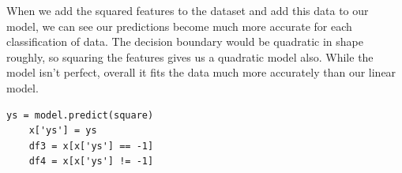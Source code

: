 \documentclass[10pt,a4paper]{article}
\begin{document}
\begin{figure}[h]
\centering
{}
\qquad
{}
\end{figure}
When we add the squared features to the dataset and add this data to our model, we can see our predictions become much more accurate for each classification of data. The decision boundary would be quadratic in shape roughly, so squaring the features gives us a quadratic model also. While the model isn't perfect, overall it fits the data much more accurately than our linear model. 
\begin{verbatim}
ys = model.predict(square)
    x['ys'] = ys
    df3 = x[x['ys'] == -1]
    df4 = x[x['ys'] != -1]
\end{verbatim}
\end{document}
